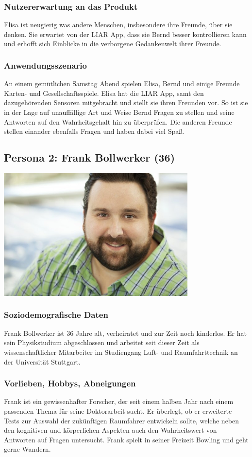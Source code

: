\documentclass[10pt, a4paper, oneside, titlepage]{scrartcl} %
\begin{document}
	\subsubsection{Nutzererwartung an das Produkt}
	Elisa ist neugierig was andere Menschen, insbesondere ihre Freunde, über sie denken. Sie erwartet von der LIAR App, dass sie Bernd besser kontrollieren kann und erhofft sich Einblicke in die verborgene Gedankenwelt ihrer Freunde.
	\subsubsection{Anwendungsszenario}
	An einem gemütlichen Samstag Abend spielen Elisa, Bernd und einige Freunde Karten- und Gesellschaftsspiele. Elisa hat die LIAR App, samt den dazugehörenden Sensoren mitgebracht und stellt sie ihren Freunden vor. So ist sie in der Lage auf unauffällige Art und Weise Bernd Fragen zu stellen und seine Antworten auf den Wahrheitsgehalt hin zu überprüfen. Die anderen Freunde stellen einander ebenfalls Fragen und haben dabei viel Spaß.
   
   	\subsection{Persona 2: Frank Bollwerker (36)}
   	\begin{center}
		\includegraphics[width=10.0cm]{persona_02.jpg}
	\end{center}
	\subsubsection{Soziodemografische Daten}
	Frank Bollwerker ist 36 Jahre alt, verheiratet und zur Zeit noch kinderlos. Er hat sein Physikstudium abgeschlossen und arbeitet seit dieser Zeit als wissenschaftlicher Mitarbeiter im Studiengang Luft- und Raumfahrttechnik an der Universität Stuttgart.
	\subsubsection{Vorlieben, Hobbys, Abneigungen}
	Frank ist ein gewissenhafter Forscher, der seit einem halben Jahr nach einem passenden Thema für seine Doktorarbeit sucht. Er überlegt, ob er erweiterte Tests zur Auswahl der zukünftigen Raumfahrer entwickeln sollte, welche neben den kognitiven und körperlichen Aspekten auch den Wahrheitswert von Antworten auf Fragen untersucht. Frank spielt in seiner Freizeit Bowling und geht gerne Wandern.
\end{document}
